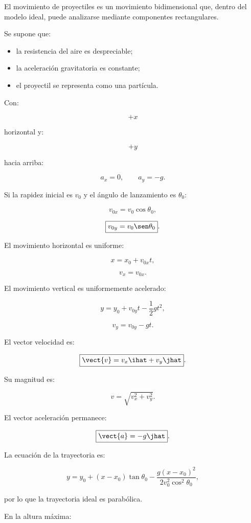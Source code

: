 \begin{resumen}
El movimiento de proyectiles es un movimiento bidimensional que, dentro del
modelo ideal, puede analizarse mediante componentes rectangulares.

Se supone que:

\begin{itemize}
    \item la resistencia del aire es despreciable;
    \item la aceleración gravitatoria es constante;
    \item el proyectil se representa como una partícula.
\end{itemize}

Con:

\[
+x
\]

horizontal y:

\[
+y
\]

hacia arriba:

\[
\boxed{
a_x=0,
\qquad
a_y=-g
}.
\]

Si la rapidez inicial es \(v_0\) y el ángulo de lanzamiento es \(\theta_0\):

\[
\boxed{
v_{0x}=v_0\cos\theta_0
},
\]

\[
\boxed{
v_{0y}=v_0\sen\theta_0
}.
\]

El movimiento horizontal es uniforme:

\[
\boxed{
x=x_0+v_{0x}t
},
\]

\[
\boxed{
v_x=v_{0x}
}.
\]

El movimiento vertical es uniformemente acelerado:

\[
\boxed{
y=y_0+v_{0y}t-\frac{1}{2}gt^2
},
\]

\[
\boxed{
v_y=v_{0y}-gt
}.
\]

El vector velocidad es:

\[
\boxed{
\vect{v}
=
v_x\ihat+v_y\jhat
}.
\]

Su magnitud es:

\[
\boxed{
v=\sqrt{v_x^2+v_y^2}
}.
\]

El vector aceleración permanece:

\[
\boxed{
\vect{a}=-g\jhat
}.
\]

La ecuación de la trayectoria es:

\[
\boxed{
y
=
y_0
+
(x-x_0)\tan\theta_0
-
\frac{
g(x-x_0)^2
}{
2v_0^2\cos^2\theta_0
}
},
\]

por lo que la trayectoria ideal es parabólica.

En la altura máxima:


\end{resumen}
